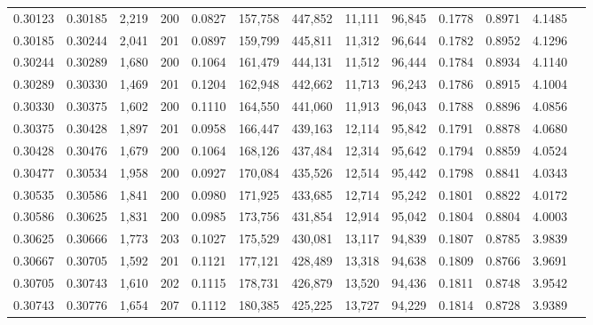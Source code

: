 \begin{tabular}{rrrrrrrrrrrrr}
0.30123 & 0.30185 & 2,219 & 200 &                                     0.0827 & 157,758 & 447,852 &  11,111 &  96,845 & 0.1778 & 0.8971 & 4.1485 \\
0.30185 & 0.30244 & 2,041 & 201 &                                     0.0897 & 159,799 & 445,811 &  11,312 &  96,644 & 0.1782 & 0.8952 & 4.1296 \\
0.30244 & 0.30289 & 1,680 & 200 &                                     0.1064 & 161,479 & 444,131 &  11,512 &  96,444 & 0.1784 & 0.8934 & 4.1140 \\
0.30289 & 0.30330 & 1,469 & 201 &                                     0.1204 & 162,948 & 442,662 &  11,713 &  96,243 & 0.1786 & 0.8915 & 4.1004 \\
0.30330 & 0.30375 & 1,602 & 200 &                                     0.1110 & 164,550 & 441,060 &  11,913 &  96,043 & 0.1788 & 0.8896 & 4.0856 \\
0.30375 & 0.30428 & 1,897 & 201 &                                     0.0958 & 166,447 & 439,163 &  12,114 &  95,842 & 0.1791 & 0.8878 & 4.0680 \\
0.30428 & 0.30476 & 1,679 & 200 &                                     0.1064 & 168,126 & 437,484 &  12,314 &  95,642 & 0.1794 & 0.8859 & 4.0524 \\
0.30477 & 0.30534 & 1,958 & 200 &                                     0.0927 & 170,084 & 435,526 &  12,514 &  95,442 & 0.1798 & 0.8841 & 4.0343 \\
0.30535 & 0.30586 & 1,841 & 200 &                                     0.0980 & 171,925 & 433,685 &  12,714 &  95,242 & 0.1801 & 0.8822 & 4.0172 \\
0.30586 & 0.30625 & 1,831 & 200 &                                     0.0985 & 173,756 & 431,854 &  12,914 &  95,042 & 0.1804 & 0.8804 & 4.0003 \\
0.30625 & 0.30666 & 1,773 & 203 &                                     0.1027 & 175,529 & 430,081 &  13,117 &  94,839 & 0.1807 & 0.8785 & 3.9839 \\
0.30667 & 0.30705 & 1,592 & 201 &                                     0.1121 & 177,121 & 428,489 &  13,318 &  94,638 & 0.1809 & 0.8766 & 3.9691 \\
0.30705 & 0.30743 & 1,610 & 202 &                                     0.1115 & 178,731 & 426,879 &  13,520 &  94,436 & 0.1811 & 0.8748 & 3.9542 \\
0.30743 & 0.30776 & 1,654 & 207 &                                     0.1112 & 180,385 & 425,225 &  13,727 &  94,229 & 0.1814 & 0.8728 & 3.9389 \\

\end{tabular}
